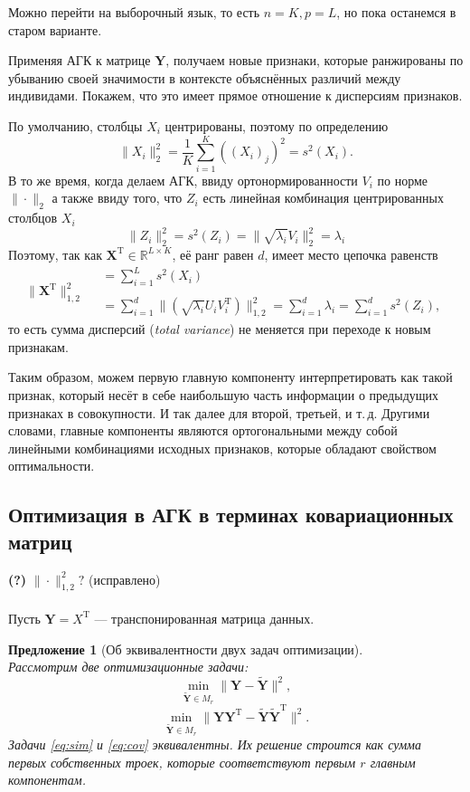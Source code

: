 \documentclass[12pt,a4paper,final]{article}
\newtheorem{proposition}{Предложение}
\begin{document}
Можно перейти на выборочный язык, то есть $n = K, p = L$, но пока останемся в старом варианте.

Применяя АГК к матрице $\bm Y$, получаем новые признаки, которые ранжированы по убыванию своей значимости в контексте объяснённых различий между индивидами. Покажем, что это имеет прямое отношение к дисперсиям признаков.

По умолчанию, столбцы $X_i$ центрированы, поэтому по определению $$\|X_i\|^2_2 = \frac{1}{K} \sum_{i = 1}^K ((X_i)_j)^2 = s^2(X_i).$$ 
В то же время, когда делаем АГК, ввиду ортонормированности $V_i$ по норме $\|\cdot\|_2$ а также ввиду того, что $Z_i$ есть линейная комбинация центрированных столбцов $X_i$
$$
\|Z_i\|^2_2 =s^2(Z_i) = \|\sqrt{\lambda_i} V_i\|^2_2 = \lambda_i 
$$
Поэтому, так как $\bm X^\mathrm{T} \in \mathbb{R}^{L \times K}$, её ранг равен $d$, имеет место цепочка равенств
$$
\| \bm X^\mathrm{T} \|^2_{1, 2} \quad \begin{matrix} =\boxed{\sum_{i = 1}^{L} s^2(X_i)} \qquad \qquad \qquad \qquad \qquad \qquad \qquad \qquad \\ \\  =\sum_{i = 1}^{d} \| (\sqrt{\lambda_i} U_i V_i^\mathrm{T}) \|^2_{1,2} = \sum_{i = 1}^d \lambda_i = \boxed{\sum_{i = 1}^ d s^2(Z_i)},  \end{matrix}
$$
то есть сумма дисперсий (\textit{total variance}) не меняется при переходе к новым признакам. 

Таким образом, можем первую главную компоненту интерпретировать как такой признак, который несёт в себе наибольшую часть информации о предыдущих признаках в совокупности. И так далее для второй, третьей, и т.\,д. Другими словами, главные компоненты являются ортогональными между собой линейными комбинациями исходных признаков, которые обладают свойством оптимальности.

\subsection{Оптимизация в АГК в терминах ковариационных матриц}
\textbf{(?)} $\| \cdot \|^2_{1,2}?$ (исправлено)
\\~\\


Пусть $\bm Y = X^\mathrm{T}$ --- транспонированная матрица данных. 

\begin{proposition}[Об эквивалентности двух задач оптимизации]
~\\
Рассмотрим две оптимизационные задачи:
\begin{equation}
\label{eq:sim}
\min_{\widetilde{\bm Y} \in M_r}{\|\bm Y -\widetilde{\bm Y} \|^2},
\end{equation}
\begin{equation}
\label{eq:cov}
\min_{\widetilde{\bm Y} \in M_r}{\|\bm Y \bm Y^\mathrm{T} -\widetilde{\bm Y} \widetilde{\bm Y}^\mathrm{T}  \|^2}.
\end{equation}
Задачи \ref{eq:sim} и \ref{eq:cov} эквивалентны. Их решение строится как сумма первых собственных троек, которые соответствуют первым $r$ главным компонентам.
\end{proposition}
\end{document}
